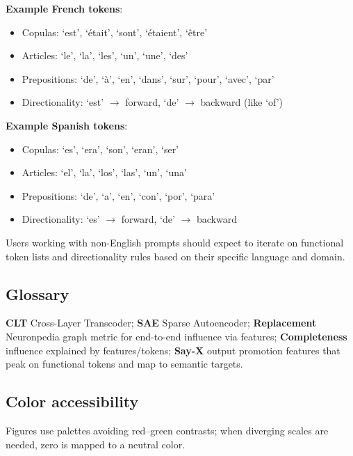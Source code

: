\textbf{Example French tokens}:
\begin{itemize}
  \item Copulas: `est', `\'etait', `sont', `\'etaient', `\^etre'
  \item Articles: `le', `la', `les', `un', `une', `des'
  \item Prepositions: `de', `\`a', `en', `dans', `sur', `pour', `avec', `par'
  \item Directionality: `est' $\rightarrow$ forward, `de' $\rightarrow$ backward (like `of')
\end{itemize}

\textbf{Example Spanish tokens}:
\begin{itemize}
  \item Copulas: `es', `era', `son', `eran', `ser'
  \item Articles: `el', `la', `los', `las', `un', `una'
  \item Prepositions: `de', `a', `en', `con', `por', `para'
  \item Directionality: `es' $\rightarrow$ forward, `de' $\rightarrow$ backward
\end{itemize}

Users working with non-English prompts should expect to iterate on functional token lists and directionality rules based on their specific language and domain.


\subsection{Glossary}
\textbf{CLT} Cross-Layer Transcoder; \textbf{SAE} Sparse Autoencoder; \textbf{Replacement} Neuronpedia graph metric for end-to-end influence via features; \textbf{Completeness} influence explained by features/tokens; \textbf{Say-X} output promotion features that peak on functional tokens and map to semantic targets.

\subsection{Color accessibility}
Figures use palettes avoiding red--green contrasts; when diverging scales are needed, zero is mapped to a neutral color.


